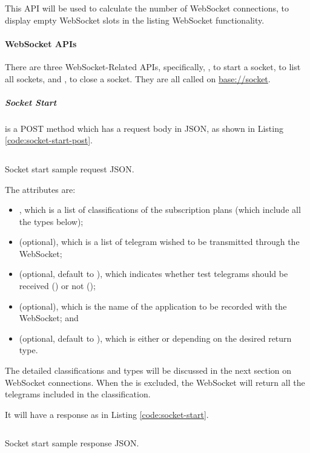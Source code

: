 This API will be used to calculate the number of WebSocket connections, to display empty WebSocket slots in the listing WebSocket functionality.

\paragraph{WebSocket APIs}

There are three WebSocket-Related APIs, specifically, , to start a socket,  to list all sockets, and , to close a socket. They are all called on \url{base://socket}.

\subparagraph{Socket Start}

 is a POST method which has a request body in JSON, as shown in Listing \ref{code:socket-start-post}.

\begin{listing}[htp]
    \inputminted{json}{code/SocketStartPost.json}
    \caption{Socket start sample request JSON.}
    \label{code:socket-start-post}
\end{listing}

The attributes are:
\begin{itemize}
    \item {}, which is a list of classifications of the subscription plans (which include all the types below);
    \item {} (optional), which is a list of telegram wished to be transmitted through the WebSocket;
    \item {} (optional, default to ), which indicates whether test telegrams should be received () or not ();
    \item {} (optional), which is the name of the application to be recorded with the WebSocket; and
    \item {} (optional, default to ), which is either  or  depending on the desired return type.
\end{itemize}

The detailed classifications and types will be discussed in the next section on WebSocket connections. When the  is excluded, the WebSocket will return all the telegrams included in the classification.

It will have a response as in Listing \ref{code:socket-start}.

\begin{listing}[htp]
    \inputminted{json}{code/SocketStart.json}
    \caption{Socket start sample response JSON.}
    \label{code:socket-start}
\end{listing}

